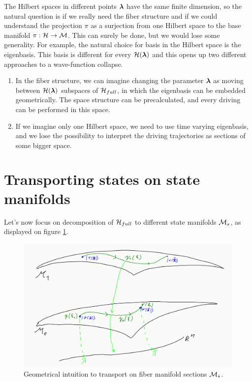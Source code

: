 The Hilbert spaces in different points ${\bm\lambda}$ have the same finite dimension, so the natural question is if we really need the fiber structure and if we could understand the projection $\pi$ as a surjection from one Hilbert space to the base manifold $\pi: \mathcal{H}\rightarrow \mathcal{M}$. This can surely be done, but we would lose some generality. For example, the natural choice for basis in the Hilbert space is the eigenbasis. This basis is different for every $\mathcal{H}({\bm\lambda})$ and this opens up two different approaches to a wave-function collapse.
\begin{enumerate}
    \item In the fiber structure, we can imagine changing the parameter ${\bm\lambda}$ as moving between $\mathcal{H}({\bm\lambda})$ subspaces of $\mathcal{H}_{full}$, in which the eigenbasis can be embedded geometrically. The space structure can be precalculated, and every driving can be performed in this space.
    \item If we imagine only one Hilbert space, we need to use time varying eigenbasis, and we lose the possibility to interpret the driving trajectories as sections of some bigger space.
\end{enumerate}








\section{Transporting states on state manifolds}
Let's now focus on decomposition of $\mathcal{H}_{full}$ to different state manifolds $\mathcal{M}_s$, as displayed on figure \ref{fig:manifoldCutIntuition}.

\begin{figure}[h]
    \centering
    \includegraphics[width=\textwidth]{../img/manifoldCutIntuition.png}
\caption{Geometrical intuition to transport on fiber manifold sections $\mathcal{M}_s$.}
    \label{fig:manifoldCutIntuition}
\end{figure}

